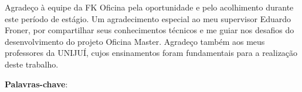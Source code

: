 \documentclass[
    12pt,               %
    oneside,            %
    a4paper,            %
    chapter=TITLE,      %
    section=TITLE,      %
    english,            %
    brazil              %
]{abntex2}
\begin{document}

\frenchspacing


\pretextual

\imprimircapa

\imprimirfolhaderosto

%     

\imprimirfolhadabanca

\begin{agradecimentos}
Agradeço à equipe da FK Oficina pela oportunidade e pelo acolhimento durante este período de estágio. Um agradecimento especial ao meu supervisor Eduardo Froner, por compartilhar seus conhecimentos técnicos e me guiar nos desafios do desenvolvimento do projeto Oficina Master. Agradeço também aos meus professores da UNIJUÍ, cujos ensinamentos foram fundamentais para a realização deste trabalho.

\end{agradecimentos}


\begin{resumo}
    \imprimirresumo
    \par
    \noindent \textbf{Palavras-chave}: \imprimirpalavraschave
\end{resumo}
\end{document}
